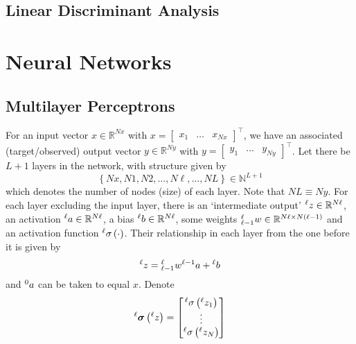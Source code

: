 \documentclass[11pt]{report} %
\begin{document}
\subsection{Linear Discriminant Analysis}

\section{Neural Networks}

\subsection{Multilayer Perceptrons}

For an input vector $x\in\mathbb{R}^{Nx}$ with $x=\begin{bmatrix}x_{1} & \dots & x_{Nx}\end{bmatrix}^{\top}$, we have an associated (target/observed) output vector $y\in\mathbb{R}^{Ny}$ with $y=\begin{bmatrix}y_{1} & \dots & y_{Ny}\end{bmatrix}^{\top}$. Let there be $L + 1$ layers in the network, with structure given by
\begin{equation}
\left\{Nx,N1,N2,\dots,N\ell,\dots,NL\right\} \in \mathbb{N}^{L + 1}
\end{equation}
which denotes the number of nodes (size) of each layer. Note that $NL\equiv Ny$. For each layer excluding the input layer, there is an `intermediate output' $\mathstrut^{\ell}z\in\mathbb{R}^{N\ell}$, an activation $\mathstrut^{\ell}a\in\mathbb{R}^{N\ell}$, a bias $\mathstrut^{\ell}b\in\mathbb{R}^{N\ell}$, some weights $\mathstrut_{\ell-1}^{\ell}w\in\mathbb{R}^{N\ell\times N\left(\ell-1\right)}$ and an activation function $\mathstrut^{\ell}\sigma\left(\cdot\right)$. Their relationship in each layer from the one before it is given by
\begin{equation}
\mathstrut^{\ell}z=\mathstrut_{\ell-1}^{\ell}w\mathstrut^{\ell-1}a+\mathstrut^{\ell}b
\end{equation}
and $\mathstrut^{0}a$ can be taken to equal $x$. Denote
\begin{equation}
\mathstrut^{\ell}\boldsymbol{\sigma}\left(\mathstrut^{\ell}z\right)=\begin{bmatrix}\mathstrut^{\ell}\sigma\left(\mathstrut^{\ell} z_{1}\right)\\
\vdots\\
\mathstrut^{\ell}\sigma\left(\mathstrut^{\ell}z_{N}\right)
\end{bmatrix}
\end{equation}
\end{document}
